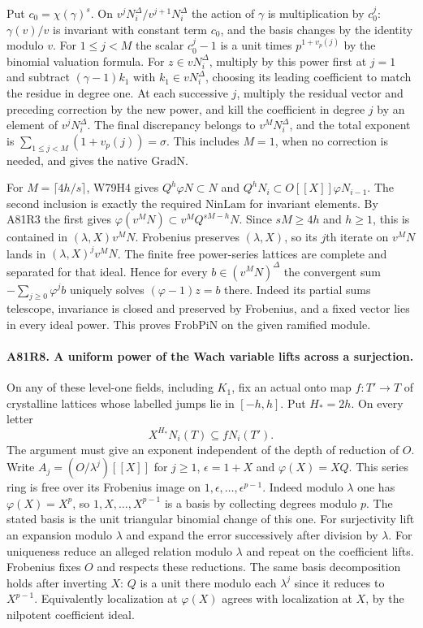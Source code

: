 Put $c_0=\chi(\gamma)^s$. On $v^jN_i^\Delta/v^{j+1}N_i^\Delta$
the action of $\gamma$ is multiplication by $c_0^j$:
$\gamma(v)/v$ is invariant with constant term $c_0$, and the
basis changes by the identity modulo $v$. For $1\le j<M$
the scalar $c_0^j-1$ is a unit times $p^{1+v_p(j)}$ by the
binomial valuation formula. For $z\in vN_i^\Delta$, multiply
by this power first at $j=1$ and subtract $(\gamma-1)k_1$
with $k_1\in vN_i^\Delta$, choosing its leading coefficient to
match the residue in degree one. At each successive $j$, multiply
the residual vector and preceding correction by the new power,
and kill the coefficient in degree $j$ by an element of
$v^jN_i^\Delta$. The final discrepancy belongs to $v^MN_i^\Delta$,
and the total exponent is $\sum_{1\le j<M}(1+v_p(j))=\sigma$.
This includes $M=1$, when no correction is needed, and gives the
native $\mathrm{GradN}$.

For $M=\lceil4h/s\rceil$, W79H4 gives $Q^h\varphi N\subset N$
and $Q^hN_i\subset O[[X]]\varphi N_{i-1}$. The second inclusion
is exactly the required $\mathrm{NinLam}$ for invariant elements.
By A81R3 the first gives
$\varphi(v^MN)\subset v^M Q^{sM-h}N$.
Since $sM\ge4h$ and $h\ge1$, this is contained in
$(\lambda,X)v^MN$. Frobenius preserves $(\lambda,X)$, so its
$j$th iterate on $v^MN$ lands in $(\lambda,X)^jv^MN$.
The finite free power-series lattices are complete and separated
for that ideal. Hence for every $b\in(v^MN)^\Delta$ the convergent
sum $-\sum_{j\ge0}\varphi^j b$ uniquely solves
$(\varphi-1)z=b$ there. Indeed its partial sums telescope,
invariance is closed and preserved by Frobenius, and a fixed
vector lies in every ideal power. This proves $\mathrm{FrobPiN}$
on the given ramified module.

\paragraph{A81R8. A uniform power of the Wach variable lifts across a surjection.}
On any of these level-one fields, including $K_1$, fix an actual
onto map $f:T'\to T$ of crystalline lattices whose labelled
jumps lie in $[-h,h]$. Put $H_*=2h$. On every letter
\[
                 X^{H_*}N_i(T)\subseteq f N_i(T').
\]
The argument must give an exponent independent of the depth
of reduction of $O$. Write $A_j=(O/\lambda^j)[[X]]$ for $j\ge1$,
$\epsilon=1+X$ and $\varphi(X)=XQ$. This series ring is free
over its Frobenius image on $1,\epsilon,\ldots,\epsilon^{p-1}$.
Indeed modulo $\lambda$ one has $\varphi(X)=X^p$, so
$1,X,\ldots,X^{p-1}$ is a basis by collecting degrees modulo $p$.
The stated basis is the unit triangular binomial change of this
one. For surjectivity lift an expansion modulo $\lambda$ and
expand the error successively after division by $\lambda$.
For uniqueness reduce an alleged relation modulo $\lambda$ and
repeat on the coefficient lifts. Frobenius fixes $O$ and respects
these reductions. The same basis decomposition holds after
inverting $X$: $Q$ is a unit there modulo each $\lambda^j$ since
it reduces to $X^{p-1}$. Equivalently localization at $\varphi(X)$
agrees with localization at $X$, by the nilpotent coefficient ideal.

